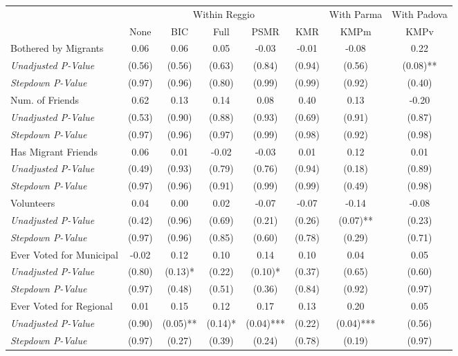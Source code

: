 \begin{tabular}{l c c c c c c c}
\toprule
& \multicolumn{5}{c}{Within Reggio} & With Parma & With Padova \\\cmidrule(lr){2-6} \cmidrule(lr){7-7} \cmidrule(lr){8-8}
 & None & BIC & Full & PSMR & KMR & KMPm & KMPv \\
\midrule
Bothered by Migrants & 0.06 & 0.06 & 0.05 & -0.03 & -0.01 & -0.08 & 0.22 \\
\quad \textit{Unadjusted P-Value} & (0.56) & (0.56) & (0.63) & (0.84) & (0.94) & (0.56) & (0.08)** \\
\quad \textit{Stepdown P-Value} & (0.97) & (0.96) & (0.80) & (0.99) & (0.99) & (0.92) & (0.40) \\
Num. of Friends & 0.62 & 0.13 & 0.14 & 0.08 & 0.40 & 0.13 & -0.20 \\
\quad \textit{Unadjusted P-Value} & (0.53) & (0.90) & (0.88) & (0.93) & (0.69) & (0.91) & (0.87) \\
\quad \textit{Stepdown P-Value} & (0.97) & (0.96) & (0.97) & (0.99) & (0.98) & (0.92) & (0.98) \\
Has Migrant Friends & 0.06 & 0.01 & -0.02 & -0.03 & 0.01 & 0.12 & 0.01 \\
\quad \textit{Unadjusted P-Value} & (0.49) & (0.93) & (0.79) & (0.76) & (0.94) & (0.18) & (0.89) \\
\quad \textit{Stepdown P-Value} & (0.97) & (0.96) & (0.91) & (0.99) & (0.99) & (0.49) & (0.98) \\
Volunteers & 0.04 & 0.00 & 0.02 & -0.07 & -0.07 & -0.14 & -0.08 \\
\quad \textit{Unadjusted P-Value} & (0.42) & (0.96) & (0.69) & (0.21) & (0.26) & (0.07)** & (0.23) \\
\quad \textit{Stepdown P-Value} & (0.97) & (0.96) & (0.85) & (0.60) & (0.78) & (0.29) & (0.71) \\
Ever Voted for Municipal & -0.02 & 0.12 & 0.10 & 0.14 & 0.10 & 0.04 & 0.05 \\
\quad \textit{Unadjusted P-Value} & (0.80) & (0.13)* & (0.22) & (0.10)* & (0.37) & (0.65) & (0.60) \\
\quad \textit{Stepdown P-Value} & (0.97) & (0.48) & (0.51) & (0.36) & (0.84) & (0.92) & (0.97) \\
Ever Voted for Regional & 0.01 & 0.15 & 0.12 & 0.17 & 0.13 & 0.20 & 0.05 \\
\quad \textit{Unadjusted P-Value} & (0.90) & (0.05)** & (0.14)* & (0.04)*** & (0.22) & (0.04)*** & (0.56) \\
\quad \textit{Stepdown P-Value} & (0.97) & (0.27) & (0.39) & (0.24) & (0.78) & (0.19) & (0.97) \\
\bottomrule
\end{tabular}

